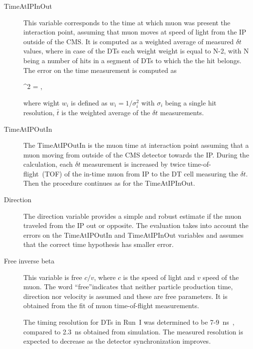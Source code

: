 \begin{description}
\item [TimeAtIPInOut]
This variable corresponds to the time at which muon was present the interaction point, assuming that muon moves at speed of light from the IP outside of the CMS. It is computed as a weighted average of measured $\delta t$ values, where in case of the DTs each weight weight is equal to N-2, with N being a number of hits in a segment of DTs to which the the hit belongs. The error on the time measurement is computed as

{
 \sigma^{2} =  \times {} \times {},
}

where wight $w_{i}$ is defined as $w_i = 1/\sigma_{i}^2$ with $\sigma_{i}$ being a single hit resolution, $\bar{t}$ is the weighted average of the $\delta t$ measurements.

\item[TimeAtIPOutIn]
The TimeAtIPOutIn is the muon time at interaction point assuming that a muon moving from outside of the CMS detector towards the IP. During the calculation, each $\delta t$ measurement is increased by twice time-of-flight~(TOF) of the in-time muon from IP to the DT cell measuring the $\delta t$. Then the procedure continues as for the TimeAtIPInOut.

\item[Direction]
The direction variable provides a simple and robust estimate if the muon traveled from the IP out or opposite. The evaluation takes into account the errors on the TimeAtIPOutIn and TimeAtIPInOut variables and assumes that the correct time hypothesis has smaller error.

\item[Free inverse beta]
This variable is free $c/v$, where $c$ is the speed of light and $v$ speed of the muon. The word ``free''indicates that neither particle production time, direction nor velocity is assumed and these are free parameters. It is obtained from the fit of muon time-of-flight measurements.

The timing resolution for DTs in Run~I was determined to be 7-9~ns~\cite{Traczyk:1365029}, compared to 2.3~ns obtained from simulation. The measured resolution is expected to decrease as the detector synchronization improves.

\end{description}

